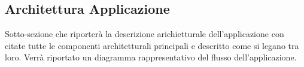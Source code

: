 \subsection{Architettura Applicazione}

Sotto-sezione che riporterà la descrizione arichietturale dell'applicazione con citate tutte le componenti architetturali principali e descritto come si legano tra loro.
Verrà riportato un diagramma rappresentativo del flusso dell'applicazione.

